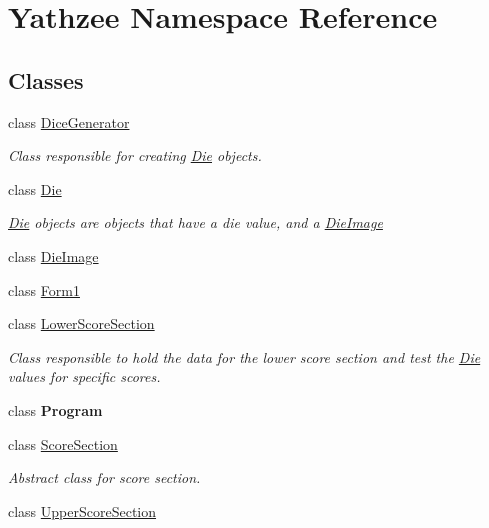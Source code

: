\hypertarget{namespace_yathzee}{}\section{Yathzee Namespace Reference}
\label{namespace_yathzee}
\subsection*{Classes}
\begin{DoxyCompactItemize}
\item 
class \hyperlink{class_yathzee_1_1_dice_generator}{Dice\+Generator}
\begin{DoxyCompactList}\small\item\em Class responsible for creating \hyperlink{class_yathzee_1_1_die}{Die} objects. \end{DoxyCompactList}\item 
class \hyperlink{class_yathzee_1_1_die}{Die}
\begin{DoxyCompactList}\small\item\em \hyperlink{class_yathzee_1_1_die}{Die} objects are objects that have a die value, and a \hyperlink{class_yathzee_1_1_die_image}{Die\+Image} \end{DoxyCompactList}\item 
class \hyperlink{class_yathzee_1_1_die_image}{Die\+Image}
\item 
class \hyperlink{class_yathzee_1_1_form1}{Form1}
\item 
class \hyperlink{class_yathzee_1_1_lower_score_section}{Lower\+Score\+Section}
\begin{DoxyCompactList}\small\item\em Class responsible to hold the data for the lower score section and test the \hyperlink{class_yathzee_1_1_die}{Die} values for specific scores. \end{DoxyCompactList}\item 
class {\bfseries Program}
\item 
class \hyperlink{class_yathzee_1_1_score_section}{Score\+Section}
\begin{DoxyCompactList}\small\item\em Abstract class for score section. \end{DoxyCompactList}\item 
class \hyperlink{class_yathzee_1_1_upper_score_section}{Upper\+Score\+Section}
\end{DoxyCompactItemize}
